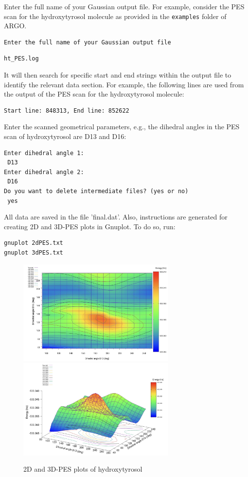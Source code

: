 \documentclass[12pt]{article}
\begin{document}
    Enter the full name of your Gaussian output file. For example, consider the PES scan for the hydroxytyrosol molecule as provided in the \texttt{examples} folder of ARGO.
    \begin{lstlisting}[style=python]
Enter the full name of your Gaussian output file
\end{lstlisting}
 \begin{lstlisting}[style=bash]
 ht_PES.log 
\end{lstlisting}
        
It will then search for specific start and end strings within the output file to identify the relevant data section. For example, the following lines are used from the output of the PES scan for the hydroxytyrosol molecule:
\begin{lstlisting}[style=bash]
Start line: 848313, End line: 852622
\end{lstlisting}
    Enter the scanned geometrical parameters, e.g., the dihedral angles in the PES scan of hydroxytyrosol are D13 and D16:
     \begin{lstlisting}[style=bash]
Enter dihedral angle 1:
 D13
Enter dihedral angle 2:
 D16
Do you want to delete intermediate files? (yes or no)
 yes
 \end{lstlisting}
 All data are saved in the file 'final.dat'. Also, instructions are generated for creating 2D and 3D-PES plots in Gnuplot. To do so, run:
    \begin{lstlisting}[style=bash]
gnuplot 2dPES.txt
gnuplot 3dPES.txt
\end{lstlisting}

\begin{figure}[h] %
    \centering
    \includegraphics[width=0.7\textwidth]{2dPES.png}
    \includegraphics[width=0.7\textwidth]{3dPES.png}
    \caption{2D and 3D-PES plots of hydroxytyrosol}
    \label{fig:2D_3D_plots}
\end{figure}
\end{document}
